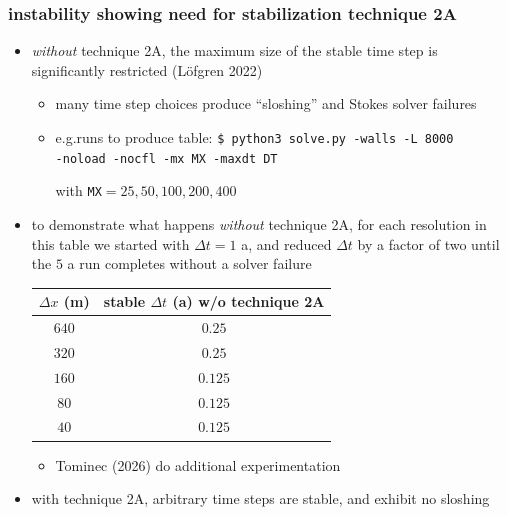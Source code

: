 \documentclass[10pt,
               hyperref={colorlinks,citecolor=DeepPink4,linkcolor=black,urlcolor=blue},
               svgnames]{beamer}
\begin{document}
\begin{frame}[fragile]
\frametitle{instability showing need for stabilization technique 2A}

\begin{itemize}
\item \emph{without} technique 2A, the maximum size of the stable time step is significantly restricted (L\"ofgren 2022)
    \begin{itemize}
    \item[$\circ$] many time step choices produce ``sloshing'' and Stokes solver failures
    \item[$\circ$] e.g.runs to produce table:  \verb|$ python3 solve.py -walls -L 8000| \verb|                      -noload -nocfl -mx MX -maxdt DT|

with \texttt{MX}$=25,50,100,200,400$
    \end{itemize}
\item to demonstrate what happens \emph{without} technique 2A, for each resolution in this table we started with $\Delta t=1$ a, and reduced $\Delta t$ by a factor of two until the $5$ a run completes without a solver failure

\medskip
\begin{center}
\small
\begin{tabular}{c|c}
$\Delta x$ (m) & stable $\Delta t$ (a) w/o technique 2A \\ \hline
$640$ & $0.25$ \\
$320$ & $0.25$ \\
$160$ & $0.125$ \\
$80$ & $0.125$ \\
$40$ & $0.125$
\end{tabular}
\normalsize
\end{center}

\smallskip
    \begin{itemize}
    \item[$\circ$] Tominec (2026) do additional experimentation
    \end{itemize}

\smallskip
\item \alert{with technique 2A, arbitrary time steps are stable}, and exhibit no sloshing
\end{itemize}
\end{frame}
\end{document}
